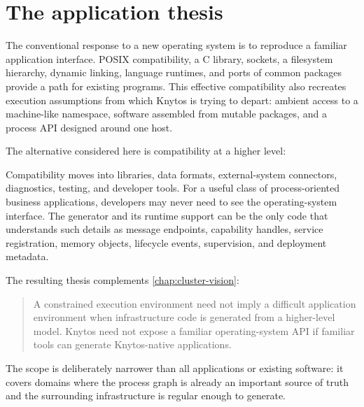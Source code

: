 \section{The application thesis}

The conventional response to a new operating system is to reproduce a familiar
application interface. POSIX compatibility, a C library, sockets, a filesystem
hierarchy, dynamic linking, language runtimes, and ports of common packages
provide a path for existing programs. This effective compatibility also
recreates execution assumptions from which Knytos is trying
to depart: ambient access to a machine-like namespace, software assembled from
mutable packages, and a process API designed around one host.

The alternative considered here is compatibility at a higher level:

\begin{center}
\end{center}

Compatibility moves into libraries, data formats, external-system connectors,
diagnostics, testing, and developer tools. For a useful class of
process-oriented business applications, developers may never need to see the
operating-system interface. The generator and its runtime support can be the only
code that understands such details as message endpoints, capability handles,
service registration, memory objects, lifecycle events, supervision, and deployment
metadata.

The resulting thesis complements \autoref{chap:cluster-vision}:

\begin{quote}
A constrained execution environment need not imply a difficult application
environment when infrastructure code is generated from a higher-level model.
Knytos need not expose a familiar operating-system API if familiar tools
can generate Knytos-native applications.
\end{quote}

The scope is deliberately narrower than all applications or existing software:
it covers domains where the process graph is already an important source of
truth and the surrounding infrastructure is regular enough to generate.

